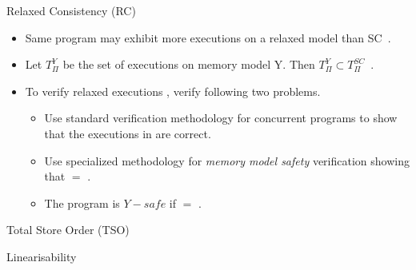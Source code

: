 \documentclass[9pt]{beamer}
\begin{document}
\begin{frame}{Relaxed Consistency (RC)}
\begin{itemize}
\item Same program may exhibit more executions on
      a relaxed model than SC~\cite{Burckhardt2008}.
  \item Let $T_{\Pi}^Y$ be the set of executions on memory model Y.
        Then $T_{\Pi}^Y \subset T_{\Pi}^{SC}$~\cite{Burckhardt2008}.
  \item To verify relaxed executions \rlxset{}, verify following two problems.
  \begin{itemize}
  \item Use standard verification methodology for concurrent programs to show that
        the executions in \scset{} are correct.
  \item Use specialized methodology for {\em memory model safety} verification
        showing that \rlxset{} $=$ \scset{}.
  \item The program is $Y-safe$  if \rlxset{} $=$ \scset{}.
  \end{itemize}
\end{itemize}
\end{frame}
\begin{frame}{Total Store Order (TSO)}

\end{frame}
\begin{frame}{Linearisability}
\end{frame}




\footnotesize{


}
\end{document}
